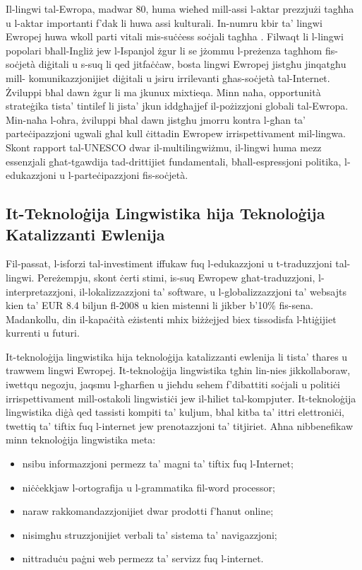 \documentclass[]{../../metanetpaper}
\begin{document}
\begin{multicols}{2}
Il-lingwi  tal-Ewropa, madwar 80, huma wieħed mill-assi l-aktar prezzjużi tagħha u l-aktar importanti f’dak li huwa assi kulturali. In-numru kbir ta’ lingwi Ewropej huwa wkoll parti vitali mis-suċċess soċjali tagħha \cite{EC2}.  Filwaqt li l-lingwi popolari bħall-Ingliż jew l-Ispanjol żgur li se jżommu l-preżenza tagħhom fis-soċjetà diġitali u s-suq li qed jitfaċċaw, bosta lingwi Ewropej jistgħu jinqatgħu mill- komunikazzjonijiet diġitali u jsiru irrilevanti għas-soċjetà tal-Internet. Żviluppi bħal dawn żgur li ma jkunux mixtieqa. Minn naħa, opportunità strateġika tista’ tintilef li jista’ jkun iddgħajjef il-pożizzjoni globali tal-Ewropa. Min-naħa l-oħra, żviluppi bħal dawn jistgħu jmorru kontra l-għan ta’ parteċipazzjoni ugwali għal kull ċittadin Ewropew irrispettivament mil-lingwa. Skont rapport tal-UNESCO dwar il-multilingwiżmu, il-lingwi huma mezz essenzjali għat-tgawdija tad-drittijiet fundamentali, bħall-espressjoni politika, l-edukazzjoni u l-parteċipazzjoni fis-soċjetà\cite{Unesco1}.

\subsection{It-Teknoloġija Lingwistika hija Teknoloġija Katalizzanti Ewlenija}

Fil-passat, l-isforzi tal-investiment iffukaw fuq l-edukazzjoni u t-traduzzjoni tal-lingwi. Pereżempju, skont ċerti stimi, is-suq Ewropew għat-traduzzjoni, l-interpretazzjoni, il-lokalizzazzjoni ta’ software, u l-globalizzazzjoni ta’ websajts kien ta' EUR 8.4 biljun fl-2008 u kien mistenni li jikber b’10\% fis-sena\cite{EC3}.  Madankollu, din il-kapaċità eżistenti mhix biżżejjed biex tissodisfa l-ħtiġijiet kurrenti u futuri.
  
It-teknoloġija lingwistika hija teknoloġija katalizzanti ewlenija li tista’ tħares u trawwem lingwi Ewropej. It-teknoloġija lingwistika tgħin lin-nies jikkollaboraw, iwettqu negozju, jaqsmu l-għarfien u jieħdu sehem f’dibattiti soċjali u politiċi irrispettivament mill-ostakoli lingwistiċi jew il-ħiliet tal-kompjuter. It-teknoloġija lingwistika diġà qed tassisti kompiti ta’ kuljum, bħal kitba ta’ ittri elettroniċi, twettiq ta’ tiftix fuq l-internet jew prenotazzjoni ta’ titjiriet. Aħna nibbenefikaw minn teknoloġija lingwistika meta:

\begin{itemize}
\item nsibu informazzjoni permezz ta’ magni ta’ tiftix fuq l-Internet; 
\item niċċekkjaw l-ortografija u l-grammatika fil-word processor;
\item naraw rakkomandazzjonijiet dwar prodotti f’ħanut online;
\item nisimgħu struzzjonijiet verbali ta’ sistema ta’ navigazzjoni;
\item nittraduċu paġni web permezz ta’ servizz fuq l-internet.
\end{itemize}


\end{multicols}
\end{document}
